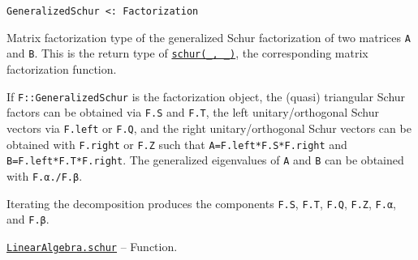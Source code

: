 \begin{adjustwidth}{2em}{0pt}


\begin{verbatim}
GeneralizedSchur <: Factorization
\end{verbatim}

Matrix factorization type of the generalized Schur factorization of two matrices \texttt{A} and \texttt{B}. This is the return type of \hyperlink{17132870828407138368}{\texttt{schur(\_, \_)}}, the corresponding matrix factorization function.

If \texttt{F::GeneralizedSchur} is the factorization object, the (quasi) triangular Schur factors can be obtained via \texttt{F.S} and \texttt{F.T}, the left unitary/orthogonal Schur vectors via \texttt{F.left} or \texttt{F.Q}, and the right unitary/orthogonal Schur vectors can be obtained with \texttt{F.right} or \texttt{F.Z} such that \texttt{A=F.left*F.S*F.right{\textquotesingle}} and \texttt{B=F.left*F.T*F.right{\textquotesingle}}. The generalized eigenvalues of \texttt{A} and \texttt{B} can be obtained with \texttt{F.α./F.β}.

Iterating the decomposition produces the components \texttt{F.S}, \texttt{F.T}, \texttt{F.Q}, \texttt{F.Z}, \texttt{F.α}, and \texttt{F.β}.



\end{adjustwidth}
\hypertarget{17132870828407138368}{} 
\hyperlink{17132870828407138368}{\texttt{LinearAlgebra.schur}}  -- {Function.}

